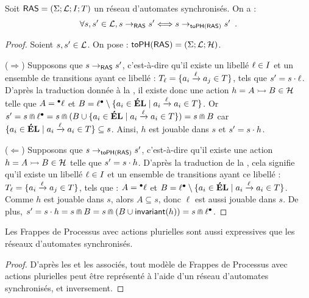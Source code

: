 \begin{theorem}[$\AN \approx \antophm$]
  Soit $\mathsf{RAS} = (\Sigma; \mathcal{L}; I; T)$ un réseau d'automates synchronisés.
  On a :
  \[\forall s, s' \in \mathcal{L}, s \rightarrow_{\mathsf{RAS}} s' \Longleftrightarrow s \rightarrow_{\mathsf{toPH}(\mathsf{RAS})} s' \enspace.\]
\end{theorem}

\begin{proof}
  Soient $s, s' \in \mathcal{L}$.
  On pose : $\mathsf{toPH}(\mathsf{RAS}) = (\Sigma; \mathcal{L}; \mathcal{H})$.
  
  ($\Rightarrow$) Supposons que $s \rightarrow_{\mathsf{RAS}} s'$,
    c'est-à-dire qu'il existe un libellé $\ell \in I$ et un ensemble de transitions
    ayant ce libellé : $T_\ell = \{ a_i \xrightarrow{\ell} a_j \in T \}$,
    tels que $s' = s \cdot \ell$.
    D'après la traduction donnée à la , il existe donc une action
    $h = \mbox{$A \rightarrowtail B$} \in \mathcal{H}$ telle que $A = {}^\bullet \ell$ et
    $B = \ell {}^\bullet \setminus \{ a_i \in \mathbf{\acute{E}L} \mid a_i \xrightarrow{\ell} a_i \in T \}$.
    Or $s' = s \Cap \ell {}^\bullet
      = s \Cap (B \cup \{ a_i \in \mathbf{\acute{E}L} \mid a_i \xrightarrow{\ell} a_i \in T \})
      = s \Cap B$
    car $\{ a_i \in \mathbf{\acute{E}L} \mid a_i \xrightarrow{\ell} a_i \in T \} \subseteq s$.
    Ainsi, $h$ est jouable dans $s$ et $s' = s \cdot h$.
  
  ($\Leftarrow$) Supposons que $s \rightarrow_{\mathsf{toPH}(\mathsf{RAS})} s'$,
    c'est-à-dire qu'il existe une action $h = \mbox{$A \rightarrowtail B$} \in \mathcal{H}$
    telle que $s' = s \cdot h$.
    D'après la traduction de la ,
    cela signifie qu'il existe un libellé $\ell \in I$ et un ensemble de transitions
    ayant ce libellé : $T_\ell = \{ a_i \xrightarrow{\ell} a_j \in T \}$,
    tels que : $A = {}^\bullet \ell$ et
    $B = \ell {}^\bullet \setminus \{ a_i \in \mathbf{\acute{E}L} \mid a_i \xrightarrow{\ell} a_i \in T \}$.
    Comme $h$ est jouable dans $s$, alors $A \subseteq s$, donc $\ell$ est aussi jouable dans $s$.
    De plus, $s' = s \cdot h = s \Cap B = s \Cap (B \cup \mathsf{invariant}(h))
      = s \Cap \ell {}^\bullet$.
\end{proof}

\begin{theorem}
  Les Frappes de Processus avec actions plurielles sont aussi expressives
  que les réseaux d'automates synchronisés.
\end{theorem}

\begin{proof}
  D'après les  et les 
  associés, tout modèle de Frappes de Processus avec actions plurielles peut être représenté
  à l'aide d'un réseau d'automates synchronisés, et inversement.
\end{proof}
